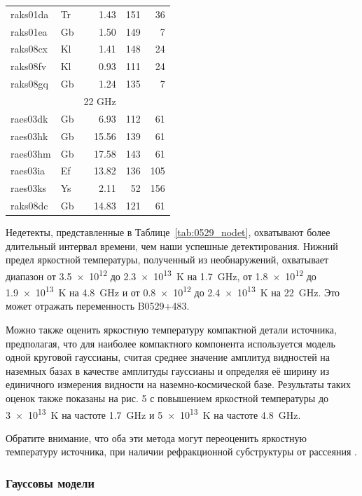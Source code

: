 \begin{table}[tbh]
\begin{SingleSpace}
\begin{tabular}{llrrr}
raks01da & Tr &  1.43 & 151 &  36 \\
raks01ea & Gb &  1.50 & 149 &   7 \\
raks08cx & Kl &  1.41 & 148 &  24 \\
raks08fv & Kl &  0.93 & 111 &  24 \\
raks08gq & Gb &  1.24 & 135 &   7 \\
\midrule
& & 22 GHz & & \\
\midrule
raes03dk & Gb &  6.93 & 112 &  61 \\
raes03hk & Gb & 15.56 & 139 &  61 \\
raes03hm & Gb & 17.58 & 143 &  61 \\
raes03ia & Ef & 13.82 & 136 & 105 \\
raes03ks & Ys &  2.11 &  52 & 156 \\
raks08dc & Gb & 14.83 & 121 &  61 \\
\bottomrule
\end{tabular}
\end{SingleSpace}
\end{table}

Недетекты, представленные в Таблице~\ref{tab:0529_nodet}, охватывают более длительный интервал
времени, чем наши
успешные детектирования. Нижний предел яркостной температуры, полученный из необнаружений,
охватывает диапазон от \num{3.5e12} до \SI{2.3e13}{\kelvin} на \SI{1.7}{\GHz}, от \num{1.8e12} до
\SI{1.9e13}{\kelvin} на \SI{4.8}{\GHz} и от \num{0.8e12} до \SI{2.4e13}{\kelvin} на \SI{22}{\GHz}.
Это может отражать переменность B0529+483.

Можно также оценить яркостную температуру компактной детали источника, предполагая, что для
наиболее компактного компонента используется модель одной круговой гауссианы, считая среднее
значение амплитуд видностей на наземных базах в качестве амплитуды гауссианы и определяя её
ширину из единичного измерения видности на наземно-космической базе. Результаты таких оценок также
показаны на рис. 5 с повышением яркостной температуры до \SI{3e13}{\kelvin} на частоте
\SI{1.7}{\GHz} и \SI{5e13}{\kelvin} на частоте \SI{4.8}{\GHz}.

Обратите внимание, что оба эти метода могут переоценить яркостную температуру источника, при
наличии рефракционной субструктуры от рассеяния \cite{Johnson_2015,Johnson_2016}.

\subsubsection{Гауссовы модели}

